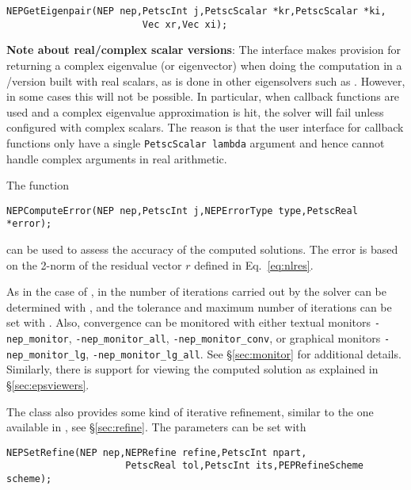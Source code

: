 	\begin{Verbatim}[fontsize=\small]
	NEPGetEigenpair(NEP nep,PetscInt j,PetscScalar *kr,PetscScalar *ki,
                        Vec xr,Vec xi);
	\end{Verbatim}

\textbf{Note about real/complex scalar versions}: The interface makes provision for returning a complex eigenvalue (or eigenvector) when doing the computation in a \petsc/\slepc version built with real scalars, as is done in other eigensolvers such as . However, in some cases this will not be possible. In particular, when callback functions are used and a complex eigenvalue approximation is hit, the solver will fail unless configured with complex scalars. The reason is that the user interface for callback functions only have a single \texttt{PetscScalar lambda} argument and hence cannot handle complex arguments in real arithmetic.

\medskip

The function
	\begin{Verbatim}[fontsize=\small]
	NEPComputeError(NEP nep,PetscInt j,NEPErrorType type,PetscReal *error);
	\end{Verbatim}
can be used to assess the accuracy of the computed solutions. The error is based on the 2-norm of the residual vector $r$ defined in Eq.\ \ref{eq:nlres}.

As in the case of , in  the number of iterations carried out by the solver can be determined with , and the tolerance and maximum number of iterations can be set with . Also, convergence can be monitored with either textual monitors \Verb!-nep_monitor!, \Verb!-nep_monitor_all!, \Verb!-nep_monitor_conv!, or graphical monitors \Verb!-nep_monitor_lg!, \Verb!-nep_monitor_lg_all!. See \S\ref{sec:monitor} for additional details. Similarly, there is support for viewing the computed solution as explained in \S\ref{sec:epsviewers}.


The  class also provides some kind of iterative refinement, similar to the one available in , see \S\ref{sec:refine}. The parameters can be set with
	\begin{Verbatim}[fontsize=\small]
	NEPSetRefine(NEP nep,NEPRefine refine,PetscInt npart,
                     PetscReal tol,PetscInt its,PEPRefineScheme scheme);
	\end{Verbatim}


